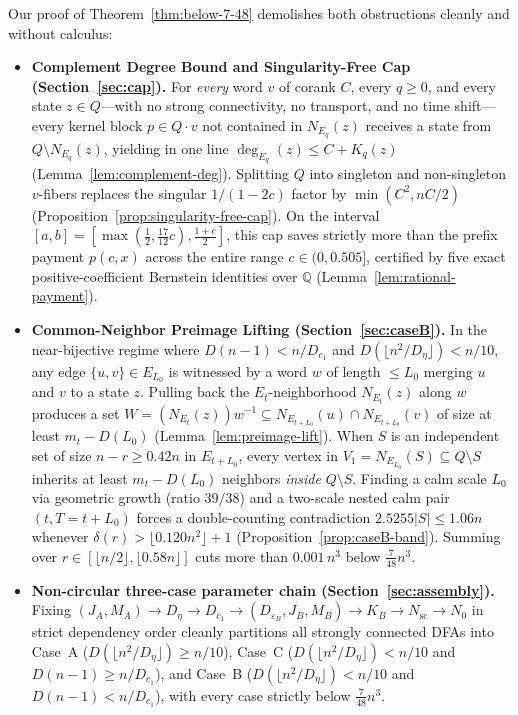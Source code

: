 \documentclass[11pt]{article}
\theoremstyle{definition}
\theoremstyle{remark}
\newcommand{\Q}{\mathbb{Q}}
\begin{document}
Our proof of Theorem~\ref{thm:below-7-48} demolishes both obstructions cleanly and without calculus:
\begin{itemize}[leftmargin=2em]
  \item \textbf{Complement Degree Bound and Singularity-Free Cap (Section~\ref{sec:cap}).} For \emph{every} word $v$ of corank $C$, every $q \ge 0$, and every state $z \in Q$---with no strong connectivity, no transport, and no time shift---every kernel block $p \in Q \cdot v$ not contained in $N_{E_q}(z)$ receives a state from $Q \setminus N_{E_q}(z)$, yielding in one line $\deg_{E_q}(z) \le C + K_q(z)$ (Lemma~\ref{lem:complement-deg}). Splitting $Q$ into singleton and non-singleton $v$-fibers replaces the singular $1/(1-2c)$ factor by $\min(C^2, nC/2)$ (Proposition~\ref{prop:singularity-free-cap}). On the interval $[a, b] = [\max(\frac{1}{2}, \frac{17}{12} c), \frac{1+c}{2}]$, this cap saves strictly more than the prefix payment $p(c, x)$ across the entire range $c \in (0, 0.505]$, certified by five exact positive-coefficient Bernstein identities over $\Q$ (Lemma~\ref{lem:rational-payment}).
  \item \textbf{Common-Neighbor Preimage Lifting (Section~\ref{sec:caseB}).} In the near-bijective regime where $D(n-1) < n / D_{c_1}$ and $D(\lfloor n^2/D_\eta \rfloor) < n/10$, any edge $\{u, v\} \in E_{L_0}$ is witnessed by a word $w$ of length $\le L_0$ merging $u$ and $v$ to a state $z$. Pulling back the $E_t$-neighborhood $N_{E_t}(z)$ along $w$ produces a set $W = (N_{E_t}(z)) w^{-1} \subseteq N_{E_{t+L_0}}(u) \cap N_{E_{t+L_0}}(v)$ of size at least $m_t - D(L_0)$ (Lemma~\ref{lem:preimage-lift}). When $S$ is an independent set of size $n - r \ge 0.42 n$ in $E_{t+L_0}$, every vertex in $V_1 = N_{E_{L_0}}(S) \subseteq Q \setminus S$ inherits at least $m_t - D(L_0)$ neighbors \emph{inside} $Q \setminus S$. Finding a calm scale $L_0$ via geometric growth (ratio $39/38$) and a two-scale nested calm pair $(t, T = t + L_0)$ forces a double-counting contradiction $2.5255 |S| \le 1.06 n$ whenever $\delta(r) > \lfloor 0.120 n^2 \rfloor + 1$ (Proposition~\ref{prop:caseB-band}). Summing over $r \in [\lfloor n/2 \rfloor, \lfloor 0.58 n \rfloor]$ cuts more than $0.001\, n^3$ below $\frac{7}{48} n^3$.
  \item \textbf{Non-circular three-case parameter chain (Section~\ref{sec:assembly}).} Fixing $(J_A, M_A) \to D_\eta \to D_{c_1} \to (D_{\varepsilon_B}, J_B, M_B) \to K_B \to N_{\mathrm{sc}} \to N_0$ in strict dependency order cleanly partitions all strongly connected DFAs into Case~A ($D(\lfloor n^2/D_\eta \rfloor) \ge n/10$), Case~C ($D(\lfloor n^2/D_\eta \rfloor) < n/10$ and $D(n-1) \ge n/D_{c_1}$), and Case~B ($D(\lfloor n^2/D_\eta \rfloor) < n/10$ and $D(n-1) < n/D_{c_1}$), with every case strictly below $\frac{7}{48} n^3$.
\end{itemize}
\end{document}
